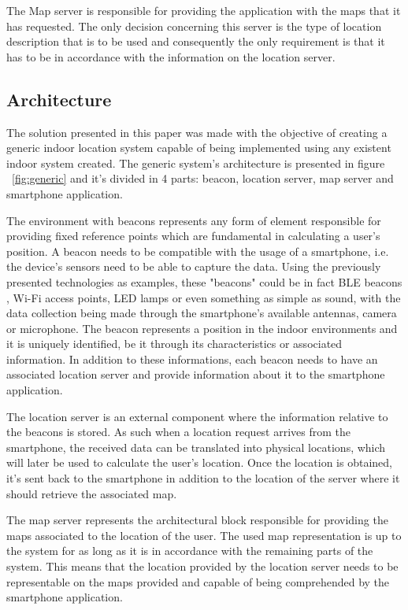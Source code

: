 \documentclass[a4paper]{IEEEtran}
\begin{document}
 
The Map server is responsible for providing the application with the maps that it has requested. The only decision concerning this server is the type of location description that is to be used and consequently the only requirement is that it has to be in accordance with the information on the location server. 
 
 
\subsection{Architecture} 
\label{subsec:architecture} 
 
 
The solution presented in this paper was made with the objective of creating a generic indoor location system capable of being implemented using any existent indoor system created. The generic system's architecture is presented in figure ~\ref{fig:generic} and it's divided in 4 parts: beacon, location server, map server and smartphone application.  
 
 
The environment with beacons represents any form of element responsible for providing fixed reference points which are fundamental in calculating a user's position. A beacon needs to be compatible with the usage of a smartphone, i.e. the device's sensors need to be able to capture the data. Using the previously presented technologies as examples, these "beacons" could be in fact BLE beacons , Wi-Fi access points, LED lamps or even something as simple as sound, with the data collection being made through the smartphone's available antennas, camera or microphone. The beacon represents a position in the indoor environments and it is uniquely identified, be it through its characteristics or associated information. In addition to these informations, each beacon needs to have an associated location server and provide information about it to the smartphone application. 
 
 
The location server is an external component where the information relative to the beacons is stored. As such when a location request arrives from the smartphone, the received data can be translated into physical locations, which will later be used to calculate the user's location. Once the location is obtained, it's sent back to the smartphone in addition to the location of the server where it should retrieve the associated map. 
 
 
The map server represents the architectural block responsible for providing the maps associated to the location of the user. The used map representation is up to the system for as long as it is in accordance with the remaining parts of the system. This means that the location provided by the location server needs to be representable on the maps provided and capable of being comprehended by the smartphone application.  
 
\end{document}
